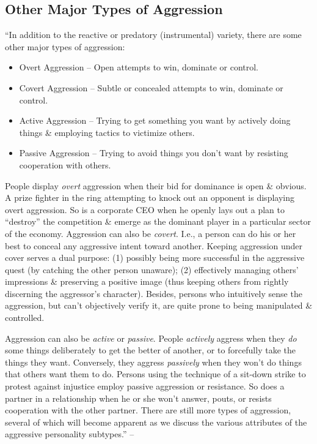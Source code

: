 \documentclass{article}
\numberwithin{equation}{section}
\begin{document}
\subsection{Other Major Types of Aggression}
``In addition to the reactive or predatory (instrumental) variety, there are some other major types of aggression:
\begin{itemize}
    \item Overt Aggression -- Open attempts to win, dominate or control.
    \item Covert Aggression -- Subtle or concealed attempts to win, dominate or control.
    \item Active Aggression -- Trying to get something you want by actively doing things \& employing tactics to victimize others.
    \item Passive Aggression -- Trying to avoid things you don't want by resisting cooperation with others.
\end{itemize}
People display \textit{overt} aggression when their bid for dominance is open \& obvious. A prize fighter in the ring attempting to knock out an opponent is displaying overt aggression. So is a corporate CEO when he openly lays out a plan to ``destroy'' the competition \& emerge as the dominant player in a particular sector of the economy. Aggression can also be \textit{covert}. I.e., a person can do his or her best to conceal any aggressive intent toward another. Keeping aggression under cover serves a dual purpose: (1) possibly being more successful in the aggressive quest (by catching the other person unaware); (2) effectively managing others' impressions \& preserving a positive image (thus keeping others from rightly discerning the aggressor's character). Besides, persons who intuitively sense the aggression, but can't objectively verify it, are quite prone to being manipulated \& controlled.

Aggression can also be \textit{active} or \textit{passive}. People \textit{actively} aggress when they \textit{do} some things deliberately to get the better of another, or to forcefully take the things they want. Conversely, they aggress \textit{passively} when they won't do things that others want them to do. Persons using the technique of a sit-down strike to protest against injustice employ passive aggression or resistance. So does a partner in a relationship when he or she won't answer, pouts, or resists cooperation with the other partner. There are still more types of aggression, several of which will become apparent as we discuss the various attributes of the aggressive personality subtypes.'' -- \cite[pp. 91--92]{Simon2011}
\end{document}
